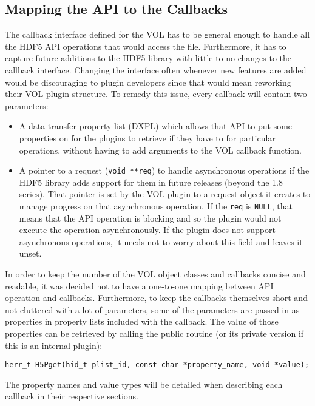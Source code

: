 \subsection{Mapping the API to the Callbacks}
\label{sec:map}

The callback interface defined for the VOL has to be general enough to
handle all the HDF5 API operations that would access the
file. Furthermore, it has to capture future additions to the HDF5
library with little to no changes to the callback interface. Changing
the interface often whenever new features are added would be
discouraging to plugin developers since that would mean reworking
their VOL plugin structure. To remedy this issue, every callback will
contain two parameters:
\begin{itemize}
\item A data transfer property list (DXPL) which allows that API to
  put some properties on for the plugins to retrieve if they have to
  for particular operations, without having to add arguments to the
  VOL callback function.
\item A pointer to a request (\texttt{void **req}) to handle asynchronous
  operations if the HDF5 library adds support for them in future
  releases (beyond the 1.8 series). That pointer is set by the VOL
  plugin to a request object it creates to manage progress on that
  asynchronous operation. If the \texttt{req} is \texttt{NULL}, that means
  that the API operation is blocking and so the plugin would not
  execute the operation asynchronously. If the plugin does not support
  asynchronous operations, it needs not to worry about this field and
  leaves it unset.
\end{itemize}

In order to keep the number of the VOL object classes and callbacks
concise and readable, it was decided not to have a one-to-one mapping
between API operation and callbacks. Furthermore, to keep the
callbacks themselves short and not cluttered with a lot of parameters,
some of the parameters are passed in as properties in property lists
included with the callback. The value of those properties can be
retrieved by calling the public routine (or its private version if
this is an internal plugin): 
\begin{lstlisting}
herr_t H5Pget(hid_t plist_id, const char *property_name, void *value);
\end{lstlisting}
The property names and value types will be detailed when describing
each callback in their respective sections.

